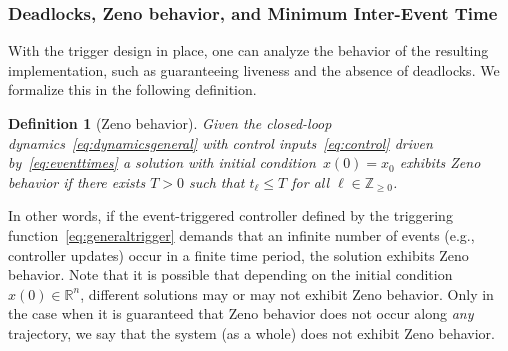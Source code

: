\documentclass{autart}
\newtheorem{definition}[theorem]{Definition}
\newcommand{\real}{{\mathbb{R}}}
\newcommand{\integernonnegative}{\mathbb{Z}_{\ge 0}}
\newcommand{\changes}[1]{{\color{blue} #1}}
\renewcommand{\changes}[1]{#1}
\begin{document}
\subsubsection{Deadlocks, Zeno behavior, and \changes{Minimum
    Inter-Event Time}}\label{se:zeno}

With the trigger design in place, one can analyze the behavior of
the resulting implementation, such as guaranteeing liveness and the
absence of deadlocks. We formalize this in the following definition.

\begin{definition}[Zeno behavior]\label{def:zeno}
  Given the closed-loop dynamics~\eqref{eq:dynamicsgeneral} with
  control inputs~\eqref{eq:control} driven by~\eqref{eq:eventtimes}
  a solution with initial condition~$x(0) = x_0$ exhibits \emph{Zeno
    behavior} if there exists $T > 0$ such that $t_{\ell} \leq T$ for
  all $\ell \in \integernonnegative$.
\end{definition}

In other words, if the event-triggered controller defined by the
triggering function~\eqref{eq:generaltrigger} demands that an infinite
number of events (e.g., controller updates) occur in a finite time
period, the solution exhibits Zeno behavior. Note that it is possible
that depending on the initial condition~$x(0) \in \real^n$, different
solutions may or may not exhibit Zeno behavior. Only in the case when
it is guaranteed that Zeno behavior does not occur along \emph{any}
trajectory, we say that the system (as a whole) does not exhibit Zeno
behavior.
\end{document}
